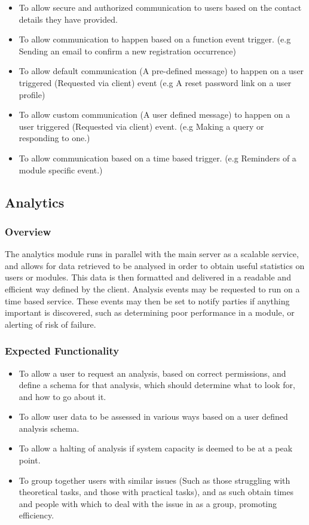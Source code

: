 \documentclass[12pt]{article}
\begin{document}
		\begin{itemize}
			\item To allow secure and authorized communication to users based on the contact details they have provided.
			\item To allow communication to happen based on a function event trigger. (e.g Sending an email to confirm a new registration occurrence)
			\item To allow default communication (A pre-defined message) to happen on a user triggered (Requested via client) event (e.g A reset password link on a user profile)
			\item To allow custom communication (A user defined message) to happen on a user triggered (Requested via client) event. (e.g Making a query or responding to one.)
			\item To allow communication based on a time based trigger. (e.g Reminders of a module specific event.)
		\end{itemize}
	
	\pagebreak
	
	\subsection{Analytics}
	
		\subsubsection{Overview}
		
		The analytics module runs in parallel with the main server as a scalable service, and allows for data retrieved to be analysed in order to obtain useful statistics on users or modules. This data is then formatted and delivered in a readable and efficient way defined by the client. Analysis events may be requested to run on a time based service. These events may then be set to notify parties if anything important is discovered, such as determining poor performance in a module, or alerting of risk of failure.
		
		\subsubsection{Expected Functionality}
		
		\begin{itemize}
			\item To allow a user to request an analysis, based on correct permissions, and define a schema for that analysis, which should determine what to look for, and how to go about it.
			\item To allow user data to be assessed in various ways based on a user defined analysis schema.
			\item To allow a halting of analysis if system capacity is deemed to be at a peak point.
			\item To group together users with similar issues (Such as those struggling with theoretical tasks, and those with practical tasks), and as such obtain times and people with which to deal with the issue in as a group, promoting efficiency.
		\end{itemize}
	
\end{document}
